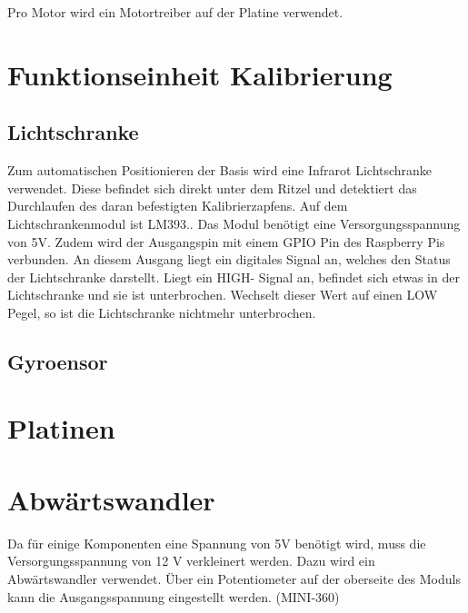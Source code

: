 Pro Motor wird ein Motortreiber auf der Platine verwendet.



\section{Funktionseinheit Kalibrierung}

\subsection{Lichtschranke}
Zum automatischen Positionieren der Basis wird eine Infrarot Lichtschranke verwendet. Diese befindet sich direkt unter dem Ritzel und detektiert das Durchlaufen des daran befestigten Kalibrierzapfens.
Auf dem Lichtschrankenmodul ist LM393..
Das Modul benötigt eine Versorgungsspannung von 5V. Zudem wird der Ausgangspin mit einem GPIO Pin des Raspberry Pis verbunden. An diesem Ausgang liegt ein digitales Signal an, welches den Status der Lichtschranke darstellt. Liegt ein HIGH- Signal an, befindet sich etwas in der Lichtschranke und sie ist unterbrochen. Wechselt dieser Wert auf einen LOW Pegel, so ist die Lichtschranke nichtmehr unterbrochen.

\subsection{Gyroensor}






\section{Platinen}



\section{Abwärtswandler}

Da für einige Komponenten eine Spannung von 5V benötigt wird, muss die Versorgungsspannung von 12 V verkleinert werden. Dazu wird ein Abwärtswandler verwendet. Über ein Potentiometer auf der oberseite des Moduls kann die Ausgangsspannung eingestellt werden. (MINI-360)






